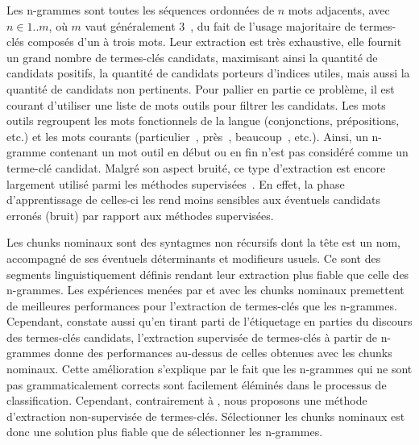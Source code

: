     Les n-grammes sont toutes les séquences ordonnées de $n$ mots adjacents,
    avec $n \in 1..m$, où $m$ vaut généralement
    3~\cite{witten1999kea,turney1999learningalgorithms,hulth2003keywordextraction},
    du fait de l'usage majoritaire de termes-clés composés d'un à trois mots.
    Leur extraction est très exhaustive, elle fournit un grand nombre de
    termes-clés candidats, maximisant ainsi la quantité de candidats positifs,
    la quantité de candidats porteurs d'indices utiles, mais aussi la quantité
    de candidats non pertinents. Pour pallier en partie ce problème, il est
    courant d'utiliser une liste de mots outils pour filtrer les candidats. Les
    mots outils regroupent les mots fonctionnels de la langue (conjonctions,
    prépositions, etc.) et les mots courants (\og particulier~\fg, \og près~\fg,
    \og beaucoup~\fg, etc.). Ainsi, un n-gramme contenant un mot outil en début
    ou en fin n'est pas considéré comme un terme-clé candidat. Malgré son aspect
    bruité, ce type d'extraction est encore largement utilisé parmi les méthodes
    supervisées~\cite{witten1999kea,turney1999learningalgorithms,hulth2003keywordextraction}.
    En effet, la phase d'apprentissage de celles-ci les rend moins sensibles aux
    éventuels candidats erronés (bruit) par rapport aux méthodes supervisées.

    Les chunks nominaux sont des syntagmes non récursifs dont la tête est un
    nom, accompagné de ses éventuels déterminants et modifieurs usuels. Ce sont
    des segments linguistiquement définis rendant leur extraction plus fiable
    que celle des n-grammes. Les expériences menées par
     et  avec les
    chunks nominaux premettent de meilleures performances  pour l'extraction de
    termes-clés que les n-grammes. Cependant,
     constate aussi qu'en tirant parti de
    l'étiquetage en parties du discours des termes-clés candidats, l'extraction
    supervisée de termes-clés à partir de n-grammes donne des performances
    au-dessus de celles obtenues avec les chunks nominaux. Cette amélioration
    s'explique par le fait que les n-grammes qui ne sont pas grammaticalement
    corrects sont facilement éléminés dans le processus de classification.
    Cependant, contrairement à , nous
    proposons une méthode d'extraction non-supervisée de termes-clés.
    Sélectionner les chunks nominaux est donc une solution plus fiable que de
    sélectionner les n-grammes.

